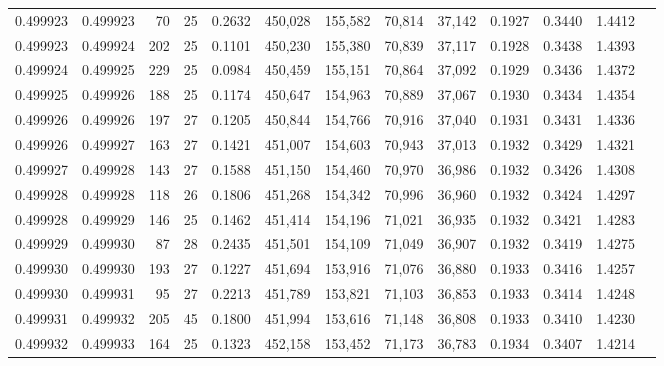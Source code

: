 \begin{tabular}{rrrrrrrrrrrrr}
0.499923 & 0.499923 &  70 &  25 &                                     0.2632 & 450,028 & 155,582 &  70,814 &  37,142 & 0.1927 & 0.3440 & 1.4412 \\
0.499923 & 0.499924 & 202 &  25 &                                     0.1101 & 450,230 & 155,380 &  70,839 &  37,117 & 0.1928 & 0.3438 & 1.4393 \\
0.499924 & 0.499925 & 229 &  25 &                                     0.0984 & 450,459 & 155,151 &  70,864 &  37,092 & 0.1929 & 0.3436 & 1.4372 \\
0.499925 & 0.499926 & 188 &  25 &                                     0.1174 & 450,647 & 154,963 &  70,889 &  37,067 & 0.1930 & 0.3434 & 1.4354 \\
0.499926 & 0.499926 & 197 &  27 &                                     0.1205 & 450,844 & 154,766 &  70,916 &  37,040 & 0.1931 & 0.3431 & 1.4336 \\
0.499926 & 0.499927 & 163 &  27 &                                     0.1421 & 451,007 & 154,603 &  70,943 &  37,013 & 0.1932 & 0.3429 & 1.4321 \\
0.499927 & 0.499928 & 143 &  27 &                                     0.1588 & 451,150 & 154,460 &  70,970 &  36,986 & 0.1932 & 0.3426 & 1.4308 \\
0.499928 & 0.499928 & 118 &  26 &                                     0.1806 & 451,268 & 154,342 &  70,996 &  36,960 & 0.1932 & 0.3424 & 1.4297 \\
0.499928 & 0.499929 & 146 &  25 &                                     0.1462 & 451,414 & 154,196 &  71,021 &  36,935 & 0.1932 & 0.3421 & 1.4283 \\
0.499929 & 0.499930 &  87 &  28 &                                     0.2435 & 451,501 & 154,109 &  71,049 &  36,907 & 0.1932 & 0.3419 & 1.4275 \\
0.499930 & 0.499930 & 193 &  27 &                                     0.1227 & 451,694 & 153,916 &  71,076 &  36,880 & 0.1933 & 0.3416 & 1.4257 \\
0.499930 & 0.499931 &  95 &  27 &                                     0.2213 & 451,789 & 153,821 &  71,103 &  36,853 & 0.1933 & 0.3414 & 1.4248 \\
0.499931 & 0.499932 & 205 &  45 &                                     0.1800 & 451,994 & 153,616 &  71,148 &  36,808 & 0.1933 & 0.3410 & 1.4230 \\
0.499932 & 0.499933 & 164 &  25 &                                     0.1323 & 452,158 & 153,452 &  71,173 &  36,783 & 0.1934 & 0.3407 & 1.4214 \\

\end{tabular}
